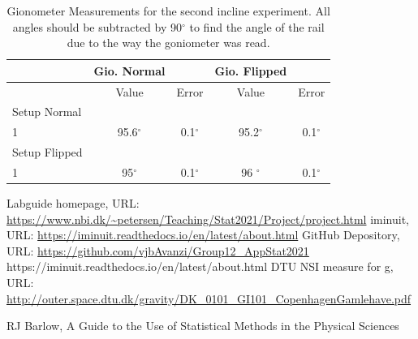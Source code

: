 \documentclass[a4paper,%
               aps,%
               prl,%
               amsfonts,%
               amssymb,%
               amsmath,%
               nobibnotes,%
               twocolumn, %
               twoside,%
               balancelastpage,%
               eqsecnum] %
               {revtex4-1}
\begin{document}
\begin{table}[H]
    \centering
    \begin{tabular}{lcc|cc}
    \hline
    & Gio. Normal && Gio. Flipped &\\
    \hline
    &Value &Error & Value & Error\\
    \hline
    \hline
    Setup Normal &&&&\\
    \hline
    1 & 95.6$^{\circ}$& 0.1$^{\circ}$ & 95.2$^{\circ}$& 0.1$^{\circ}$\\
    \hline\hline
    Setup Flipped &&&&\\
    \hline
    1& 95$^{\circ}$ & 0.1$^{\circ}$ & 96 $^{\circ}$ & 0.1$^{\circ}$\\
    \hline
    \end{tabular}
    \caption{Gionometer Measurements for the second incline experiment. All angles should be subtracted by 90$^{\circ}$ to find the angle of the rail due to the way the goniometer was read.}
    \label{tab:angles2}
\end{table}


\begin{thebibliography}{99}  
Labguide homepage, URL: \url{https://www.nbi.dk/~petersen/Teaching/Stat2021/Project/project.html}
iminuit, URL: \url{https://iminuit.readthedocs.io/en/latest/about.html}
GitHub Depository, URL: \url{https://github.com/vjbAvanzi/Group12_AppStat2021}
{https://iminuit.readthedocs.io/en/latest/about.html}
DTU NSI measure for g, URL: \url{http://outer.space.dtu.dk/gravity/DK_0101_GI101_CopenhagenGamlehave.pdf}

RJ Barlow, A Guide to the Use of Statistical Methods in the Physical Sciences


\end{thebibliography}
\end{document}
